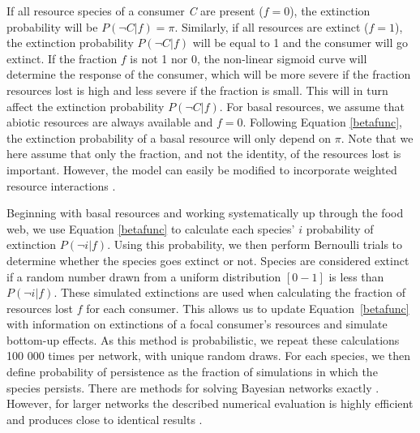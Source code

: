 \documentclass[12pt]{article}
\begin{document}
\begin{spacing}{2.0}
		If all resource species of a consumer \textit{C} are present ($f = 0$), the extinction probability will be $P(\lnot C|f) = \pi$. 
		Similarly, if all resources are extinct ($f = 1$), the extinction probability $P(\lnot C|f)$ will be equal to 1 and the consumer will go extinct.
		If the fraction $f$ is not 1 nor 0, the non-linear sigmoid curve will determine the response of the consumer, which will be more severe if the fraction resources lost is high and less severe if the fraction is small. This will in turn affect the extinction probability $P(\lnot C|f)$.
		For basal resources, we assume that abiotic resources are always available and $f=0$. 
		Following Equation \ref{betafunc}, the extinction probability of a basal resource will only depend on $\pi$.
		Note that we here assume that only the fraction, and not the identity, of the resources lost is important. 
		However, the model can easily be modified to incorporate weighted resource interactions \citep[see][]{Eklof2013}.
		
		
        Beginning with basal resources and working systematically up through the food web, we use Equation \ref{betafunc} to calculate each species' $i$ probability of extinction $P(\lnot i|f)$.
        Using this probability, we then perform Bernoulli trials to determine whether the species goes extinct or not. 
        Species are considered extinct if a random number drawn from a uniform distribution $[0-1]$ is less than $P(\lnot i|f)$.
        These simulated extinctions are used when calculating the fraction of resources lost $f$ for each consumer.
        This allows us to update Equation~\ref{betafunc} with information on extinctions of a focal consumer's resources and simulate bottom-up effects. As this method is probabilistic, we repeat these calculations 100 000 times per network, with unique random draws.
	    For each species, we then define probability of persistence as the fraction of simulations in which the species persists. There are methods for solving Bayesian networks exactly \citep{Eklof2013}.
	    However, for larger networks the described numerical evaluation is highly efficient and produces close to identical results \citep{Haussler2020}.
		

\end{spacing}
\end{document}
